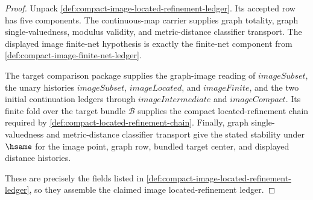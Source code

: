 \begin{proof}
Unpack \autoref{def:compact-image-located-refinement-ledger}. Its accepted row
has five components. The continuous-map carrier supplies graph totality, graph
single-valuedness, modulus validity, and metric-distance classifier transport.
The displayed image finite-net hypothesis is exactly the finite-net component
from \autoref{def:compact-image-finite-net-ledger}.

The target comparison package supplies the graph-image reading of
$imageSubset$, the unary histories $imageSubset$, $imageLocated$, and
$imageFinite$, and the two initial continuation ledgers through
$imageIntermediate$ and $imageCompact$. Its finite fold over the target bundle
$\mathcal{B}$ supplies the compact located-refinement chain required by
\autoref{def:compact-located-refinement-chain}. Finally, graph single-valuedness
and metric-distance classifier transport give the stated stability under
$\hsame$ for the image point, graph row, bundled target center, and displayed
distance histories.

These are precisely the fields listed in
\autoref{def:compact-image-located-refinement-ledger}, so they assemble the
claimed image located-refinement ledger.
\end{proof}

